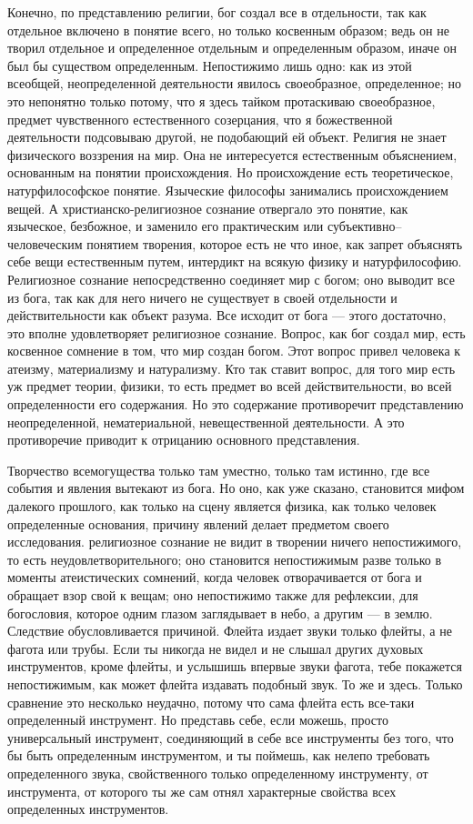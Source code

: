 \documentclass[12pt,oneside]{book}
\begin{document}
Конечно, по представлению религии, бог создал все в отдельности, так как отдельное включено в понятие всего, но только косвенным образом; ведь он не творил отдельное и определенное отдельным и определенным образом, иначе он был бы существом определенным. Непостижимо лишь одно: как из этой всеобщей, неопределенной деятельности явилось своеобразное, определенное; но это непонятно только потому, что я здесь тайком протаскиваю своеобразное, предмет чувственного естественного созерцания, что я божественной деятельности подсовываю другой, не подобающий ей объект. Религия не знает физического воззрения на мир. Она не интересуется естественным объяснением, основанным на понятии происхождения. Но происхождение есть теоретическое, натурфилософское понятие. Языческие философы занимались происхождением вещей. А христианско-религиозное сознание отвергало это понятие, как языческое, безбожное, и заменило его практическим или субъективно– человеческим понятием творения, которое есть не что иное, как запрет объяснять себе вещи естественным путем, интердикт на всякую физику и натурфилософию. Религиозное сознание непосредственно соединяет мир с богом; оно выводит все из бога, так как для него ничего не существует в своей отдельности и действительности как объект разума. Все исходит от бога --- этого достаточно, это вполне удовлетворяет религиозное сознание. Вопрос, как бог создал мир, есть косвенное сомнение в том, что мир создан богом. Этот вопрос привел человека к атеизму, материализму и натурализму. Кто так ставит вопрос, для того мир есть уж предмет теории, физики, то есть предмет во всей действительности, во всей определенности его содержания. Но это содержание противоречит представлению неопределенной, нематериальной, невещественной деятельности. А это противоречие приводит к отрицанию основного представления.

Творчество всемогущества только там уместно, только там истинно, где все события и явления вытекают из бога. Но оно, как уже сказано, становится мифом далекого прошлого, как только на сцену является физика, как только человек определенные основания, причину явлений делает предметом своего исследования. религиозное сознание не видит в творении ничего непостижимого, то есть неудовлетворительного; оно становится непостижимым разве только в моменты атеистических сомнений, когда человек отворачивается от бога и обращает взор свой к вещам; оно непостижимо также для рефлексии, для богословия, которое одним глазом заглядывает в небо, а другим --- в землю. Следствие обусловливается причиной. Флейта издает звуки только флейты, а не фагота или трубы. Если ты никогда не видел и не слышал других духовых инструментов, кроме флейты, и услышишь впервые звуки фагота, тебе покажется непостижимым, как может флейта издавать подобный звук. То же и здесь. Только сравнение это несколько неудачно, потому что сама флейта есть все-таки определенный инструмент. Но представь себе, если можешь, просто универсальный инструмент, соединяющий в себе все инструменты без того, что бы быть определенным инструментом, и ты поймешь, как нелепо требовать определенного звука, свойственного только определенному инструменту, от инструмента, от которого ты же сам отнял характерные свойства всех определенных инструментов.
\end{document}
